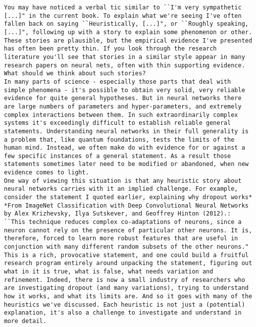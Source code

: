 \begin{lstlisting}
You may have noticed a verbal tic similar to ``I'm very sympathetic [...]" in the current book. To explain what we're seeing I've often fallen back on saying ``Heuristically, [...]", or ``Roughly speaking, [...]", following up with a story to explain some phenomenon or other. These stories are plausible, but the empirical evidence I've presented has often been pretty thin. If you look through the research literature you'll see that stories in a similar style appear in many research papers on neural nets, often with thin supporting evidence. What should we think about such stories?
In many parts of science - especially those parts that deal with simple phenomena - it's possible to obtain very solid, very reliable evidence for quite general hypotheses. But in neural networks there are large numbers of parameters and hyper-parameters, and extremely complex interactions between them. In such extraordinarily complex systems it's exceedingly difficult to establish reliable general statements. Understanding neural networks in their full generality is a problem that, like quantum foundations, tests the limits of the human mind. Instead, we often make do with evidence for or against a few specific instances of a general statement. As a result those statements sometimes later need to be modified or abandoned, when new evidence comes to light.
One way of viewing this situation is that any heuristic story about neural networks carries with it an implied challenge. For example, consider the statement I quoted earlier, explaining why dropout works* *From ImageNet Classification with Deep Convolutional Neural Networks by Alex Krizhevsky, Ilya Sutskever, and Geoffrey Hinton (2012).: ``This technique reduces complex co-adaptations of neurons, since a neuron cannot rely on the presence of particular other neurons. It is, therefore, forced to learn more robust features that are useful in conjunction with many different random subsets of the other neurons." This is a rich, provocative statement, and one could build a fruitful research program entirely around unpacking the statement, figuring out what in it is true, what is false, what needs variation and refinement. Indeed, there is now a small industry of researchers who are investigating dropout (and many variations), trying to understand how it works, and what its limits are. And so it goes with many of the heuristics we've discussed. Each heuristic is not just a (potential) explanation, it's also a challenge to investigate and understand in more detail.

\end{lstlisting}
